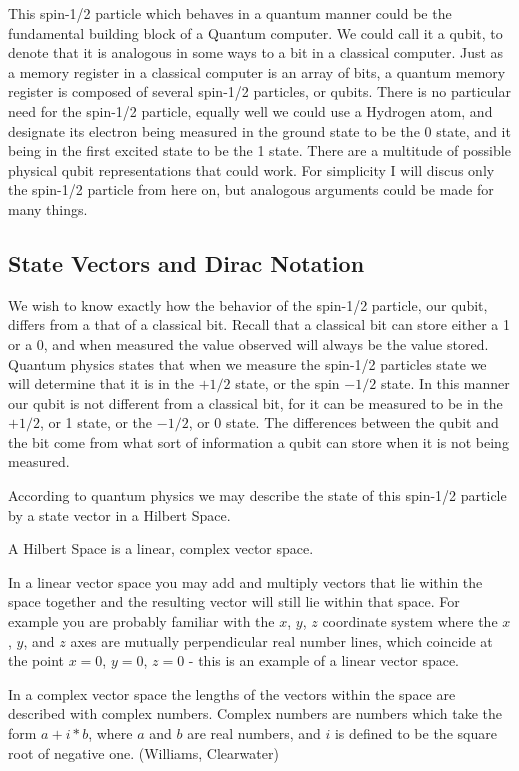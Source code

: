 \documentclass[]{article}
\begin{document}
This spin-1/2 particle which behaves in a quantum manner could be the
fundamental building block of a Quantum computer.  We could call it a
qubit, to denote that it is analogous in some ways to a bit in a
classical computer.  Just as a memory register in a classical computer
is an array of bits, a quantum memory register is composed of several
spin-1/2 particles, or qubits.  There is no particular need for the
spin-1/2 particle, equally well we could use a Hydrogen atom, and
designate its electron being measured in the ground state to be the 0
state, and it being in the first excited state to be the 1 state.
There are a multitude of possible physical qubit representations that
could work.  For simplicity I will discus only the spin-1/2 particle
from here on, but analogous arguments could be made for many things.

\subsection{State Vectors and Dirac Notation}

We wish to know exactly how the behavior of the spin-1/2 particle, our
qubit, differs from a that of a classical bit.  Recall that a
classical bit can store either a 1 or a 0, and when measured the value
observed will always be the value stored.  Quantum physics states that
when we measure the spin-1/2 particles state we will determine that it
is in the $+1/2$ state, or the spin $-1/2$ state.  In this manner our
qubit is not different from a classical bit, for it can be measured to
be in the $+1/2$, or 1 state, or the $-1/2$, or 0 state.  The
differences between the qubit and the bit come from what sort of
information a qubit can store when it is not being measured.

According to quantum physics we may describe the state of this
spin-1/2 particle by a state vector in a Hilbert Space.

A Hilbert Space is a linear, complex vector space.

In a linear vector space you may add and multiply vectors that lie
within the space together and the resulting vector will still lie
within that space.  For example you are probably familiar with the
$x$, $y$, $z$ coordinate system where the $x$, $y$, and $z$ axes are
mutually perpendicular real number lines, which coincide at the point
$x = 0$, $y = 0$, $z = 0$ - this is an example of a linear vector
space.

In a complex vector space the lengths of the vectors within the space
are described with complex numbers.  Complex numbers are numbers which
take the form $a + i*b$, where $a$ and $b$ are real numbers, and $i$
is defined to be the square root of negative one.
(Williams, Clearwater)
\end{document}
